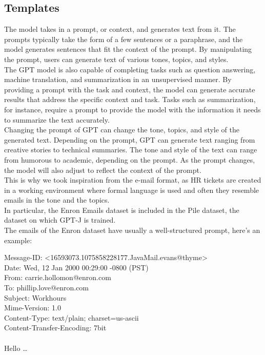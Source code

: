 \subsection*{Templates}
The model takes in a prompt, or context, and generates text from it. The prompts typically take the form of a few sentences or a paraphrase, and the model generates sentences that fit the context of the prompt. By manipulating the prompt, users can generate text of various tones, topics, and styles. \\
The GPT model is also capable of completing tasks such as question answering, machine translation, and summarization in an unsupervised manner\cite{radford2019language}. By providing a prompt with the task and context, the model can generate accurate results that address the specific context and task. Tasks such as summarization, for instance, require a prompt to provide the model with the information it needs to summarize the text accurately. \\
Changing the prompt of GPT can change the tone, topics, and style of the generated text. Depending on the prompt, GPT can generate text ranging from creative stories to technical summaries. The tone and style of the text can range from humorous to academic, depending on the prompt. As the prompt changes, the model will also adjust to reflect the context of the prompt. \\
This is why we took inspiration from the e-mail format, as HR tickets are created in a working environment where formal language is used and often they resemble emails in the tone and the topics. \\
In particular, the Enron Emails dataset is included in the Pile dataset, the dataset on which GPT-J is trained. \\
The emails of the Enron dataset have usually a well-structured prompt, here's an example: 
\begin{adjustwidth}{1cm}{}
    Message-ID: <16593073.1075858228177.JavaMail.evans@thyme>\\
    Date: Wed, 12 Jan 2000 00:29:00 -0800 (PST) \\
    From: carrie.hollomon@enron.com\\
    To: phillip.love@enron.com\\
    Subject: Workhours\\
    Mime-Version: 1.0\\
    Content-Type: text/plain; charset=us-ascii\\
    Content-Transfer-Encoding: 7bit\\\\
    Hello \dots
\end{adjustwidth}
